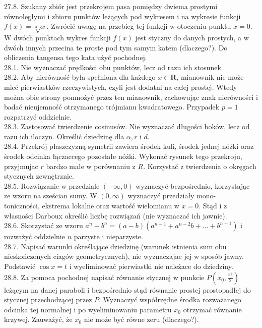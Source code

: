 \documentclass[10pt]{article}
\begin{document}
27.8. Szukany zbiór jest przekrojem pasa pomiędzy dwiema prostymi równoległymi i zbioru punktów leżących pod wykresem i na wykresie funkcji $f(x)=\sqrt[3]{x}$. Zwrócić uwagę na przebieg tej funkcji w otoczeniu punktu $x=0$. W dwóch punktach wykres funkcji $f(x)$ jest styczny do danych prostych, a w dwóch innych przecina te proste pod tym samym katem (dlaczego?). Do obliczenia tangensa tego kata użyć pochodnej.\\
28.1. Nie wyznaczać prędkości obu punktów, lecz od razu ich stosunek.\\
28.2. Aby nierówność była spełniona dla każdego $x \in \mathbf{R}$, mianownik nie może mieć pierwiastków rzeczywistych, czyli jest dodatni na całej prostej. Wtedy można obie strony pomnożyć przez ten mianownik, zachowując znak nierówności i badać nieujemność otrzymanego trójmianu kwadratowego. Przypadek $p=1$ rozpatrzyć oddzielnie.\\
28.3. Zastosować twierdzenie cosinusów. Nie wyznaczać długości boków, lecz od razu ich iloczyn. Określić dziedzinę dla $\alpha, r$ i $d$.\\
28.4. Przekrój płaszczyzną symetrii zawiera środek kuli, środek jednej nóżki oraz środek odcinka łączaccego pozostałe nóżki. Wykonać rysunek tego przekroju, przyjmujac $r$ bardzo małe w porównaniu z $R$. Korzystać z twierdzenia o okręgach stycznych zewnętrznie.\\
28.5. Rozwiązanie w przedziale $(-\infty, 0)$ wyznaczyć bezpośrednio, korzystając ze wzoru na sześcian sumy. W $(0, \infty)$ wyznaczyć przedziały mono-\\
toniczności, ekstrema lokalne oraz wartość wielomianu w $x=0$. Stąd i z własności Darboux określić liczbę rozwiązań (nie wyznaczać ich jawnie).\\
28.6. Skorzystać ze wzoru $a^{n}-b^{n}=(a-b)\left(a^{n-1}+a^{n-2} b+\ldots+b^{n-1}\right)$ i rozważyć oddzielnie $n$ parzyste i nieparzyste.\\
28.7. Napisać warunki określające dziedzinę (warunek istnienia sum obu nieskończonych ciagów geometrycznych), nie wyznaczajac jej w sposób jawny. Podstawić $\cos x=t$ i wyeliminować pierwiastki nie należace do dziedziny.\\
28.8. Za pomoca pochodnej napisać równanie stycznej w punkcie $P\left(x_{0}, \frac{x_{0}^{2}}{2}\right)$ leżącym na danej paraboli i bezpośrednio stąd równanie prostej prostopadłej do stycznej przechodzącej przez $P$. Wyznaczyć współrzędne środka rozważanego odcinka tej normalnej i po wyeliminowaniu parametru $x_{0}$ otrzymać równanie krzywej. Zauważyć, że $x_{0}$ nie może być równe zeru (dlaczego?).\\
\end{document}
